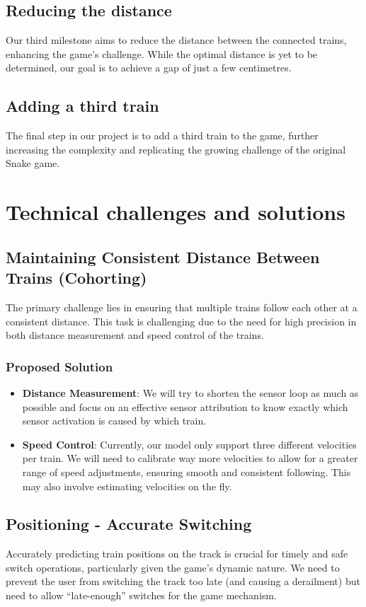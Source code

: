 \documentclass[10pt]{article}
\begin{document}
\subsection{Reducing the distance}
Our third milestone aims to reduce the distance between the connected trains, enhancing the game's challenge. While the optimal distance is yet to be determined, our goal is to achieve a gap of just a few centimetres.

\subsection{Adding a third train}
The final step in our project is to add a third train to the game, further increasing the complexity and replicating the growing challenge of the original Snake game.

\section{Technical challenges and solutions}
\subsection{Maintaining Consistent Distance Between Trains (Cohorting)}
The primary challenge lies in ensuring that multiple trains follow each other at a consistent distance. This task is challenging due to the need for high precision in both distance measurement and speed control of the trains.

\subsubsection*{Proposed Solution}
\begin{itemize}
    \item \textbf{Distance Measurement}: We will try to shorten the sensor loop as much as possible and focus on an effective sensor attribution to know exactly which sensor activation is caused by which train.
    \item \textbf{Speed Control}: Currently, our model only support three different velocities per train. We will need to calibrate way more velocities to allow for a greater range of speed adjustments, ensuring smooth and consistent following. This may also involve estimating velocities on the fly.
\end{itemize}

\subsection{Positioning - Accurate Switching}
Accurately predicting train positions on the track is crucial for timely and safe switch operations, particularly given the game's dynamic nature. We need to prevent the user from switching the track too late (and causing a derailment) but need to allow ``late-enough'' switches for the game mechanism.
\end{document}
